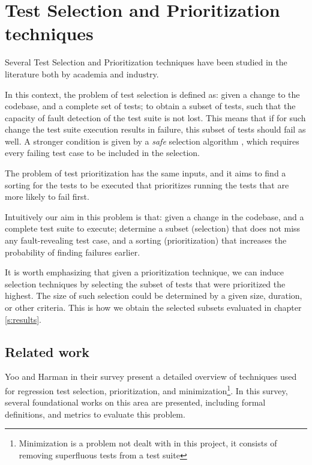 \section{Test Selection and Prioritization techniques}\label{s:tsp-tech}

Several Test Selection and Prioritization techniques have been studied in
the literature both by academia and industry.

In this context, the problem of test selection is defined as: given a change
to the codebase, and a complete set of tests; to obtain a subset of tests,
such that the capacity of fault detection of the test suite is not lost. This 
means that if for such change the test suite execution results in failure, this subset
of tests should fail as well. A stronger condition is given by a \emph{safe} 
selection algorithm \cite{366926}, which requires every failing test case to be included in the selection.

The problem of test prioritization has the same inputs, and it aims to find a
sorting for the tests to be executed that prioritizes running the tests that
are more likely to fail first.

Intuitively our aim in this problem is that: given a change in the codebase,
and a complete test suite to execute; determine a subset (selection) that
does not miss any fault-revealing test case, and a sorting (prioritization)
that increases the probability of finding failures earlier.

It is worth emphasizing that given a prioritization technique, we can induce
selection techniques by selecting the subset of tests that were prioritized the highest. 
The size of such selection could be determined by a given size, duration, or other criteria.
This is how we obtain the selected subsets evaluated in chapter \ref{s:results}.

\subsection{Related work}
\label{sec:bg-tsp-related-work}

Yoo and Harman in their survey \cite{Yoo2012RegressionTM} present a detailed overview of techniques used for
regression test selection, prioritization, and minimization\footnote{Minimization is a problem not dealt with in this project, it consists of removing superfluous tests from a test suite}.
In this survey, several foundational works on this area are presented, including formal definitions, and metrics to evaluate this problem.


